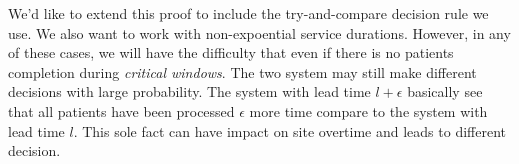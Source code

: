 We'd like to extend this proof to include the try-and-compare decision
rule we use. We also want to work with non-expoential service durations.
However, in any of these cases, we will have the difficulty that even
if there is no patients completion during \textit{critical windows}.
The two system may still make different decisions with large probability.
The system with lead time $l+\epsilon$ basically see that all patients
have been processed $\epsilon$ more time compare to the system with lead
time $l$. This sole fact can have impact on site overtime and leads
to different decision.
